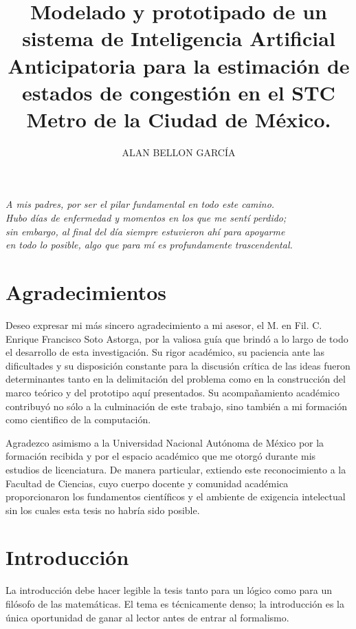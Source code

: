 \documentclass[letterpaper,12pt,oneside]{book}
\author{ALAN BELLON GARCÍA}
\title{Modelado y prototipado de un sistema de Inteligencia Artificial Anticipatoria para la
estimación de estados de congestión en el STC Metro de la Ciudad de México.
}
\theoremstyle{definition}
\theoremstyle{plain}
\theoremstyle{remark}
\begin{document}
\frontmatter
\maketitle
\clearpage
\thispagestyle{empty}
\vspace*{3cm}
\begin{flushright}
  \emph{A mis padres, por ser el pilar fundamental en todo este camino.}\\[0.2em]
  \emph{Hubo días de enfermedad y momentos en los que me sentí perdido;}\\[0.2em]
  \emph{sin embargo, al final del día siempre estuvieron ahí para apoyarme}\\[0.2em]
  \emph{en todo lo posible, algo que para mí es profundamente trascendental.}
\end{flushright}

\chapter{Agradecimientos}
Deseo expresar mi más sincero agradecimiento a mi asesor, el M. en Fil. C. Enrique
Francisco Soto Astorga, por la valiosa guía que brindó a lo largo de todo el desarrollo
de esta investigación. Su rigor académico, su paciencia ante las dificultades y su
disposición constante para la discusión crítica de las ideas fueron determinantes tanto
en la delimitación del problema como en la construcción del marco teórico y del
prototipo aquí presentados. Su acompañamiento académico contribuyó no sólo a la
culminación de este trabajo, sino también a mi formación como cientifico de la computación.

Agradezco asimismo a la Universidad Nacional Autónoma de México por la formación
recibida y por el espacio académico que me otorgó durante mis estudios de licenciatura.
De manera particular, extiendo este reconocimiento a la Facultad de Ciencias, cuyo
cuerpo docente y comunidad académica proporcionaron los fundamentos científicos y el
ambiente de exigencia intelectual sin los cuales esta tesis no habría sido posible.

\tableofcontents
\listoffigures
    
\mainmatter

\chapter{Introducción}
La introducción debe hacer legible la tesis tanto para un lógico como para un filósofo de las matemáticas. El tema es técnicamente denso; la introducción es la única oportunidad de ganar al lector antes de entrar al formalismo.
\end{document}
